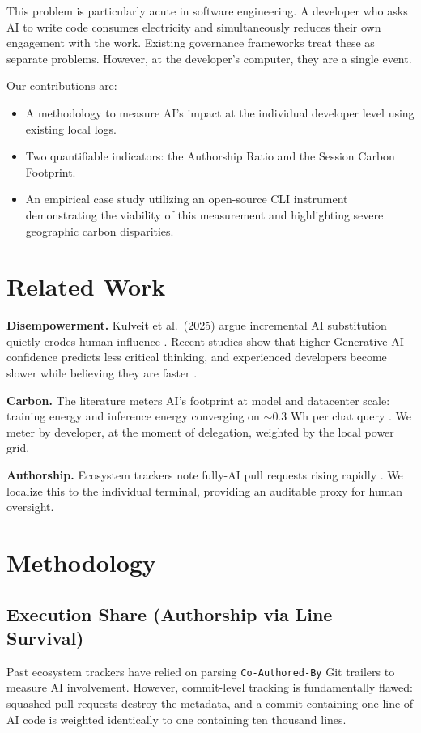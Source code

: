 \documentclass[11pt,a4paper]{article}
\begin{document}
This problem is particularly acute in software engineering. A developer who asks AI to write code consumes electricity and simultaneously reduces their own engagement with the work. Existing governance frameworks treat these as separate problems. However, at the developer's computer, they are a single event.

Our contributions are:
\begin{itemize}
    \item A methodology to measure AI's impact at the individual developer level using existing local logs.
    \item Two quantifiable indicators: the Authorship Ratio and the Session Carbon Footprint.
    \item An empirical case study utilizing an open-source CLI instrument demonstrating the viability of this measurement and highlighting severe geographic carbon disparities.
\end{itemize}

\section{Related Work}
\textbf{Disempowerment.} Kulveit et al.\ (2025) argue incremental AI substitution quietly erodes human influence \cite{kulveit2025gradual}. Recent studies show that higher Generative AI confidence predicts less critical thinking, and experienced developers become slower while believing they are faster \cite{metr2025}.

\textbf{Carbon.} The literature meters AI's footprint at model and datacenter scale: training energy and inference energy converging on $\sim$0.3 Wh per chat query \cite{oviedo2025energy, you2025energy}. We meter by developer, at the moment of delegation, weighted by the local power grid.

\textbf{Authorship.} Ecosystem trackers note fully-AI pull requests rising rapidly \cite{greptile2026}. We localize this to the individual terminal, providing an auditable proxy for human oversight.

\section{Methodology}
\subsection{Execution Share (Authorship via Line Survival)}
Past ecosystem trackers have relied on parsing \texttt{Co-Authored-By} Git trailers to measure AI involvement. However, commit-level tracking is fundamentally flawed: squashed pull requests destroy the metadata, and a commit containing one line of AI code is weighted identically to one containing ten thousand lines.
\end{document}

